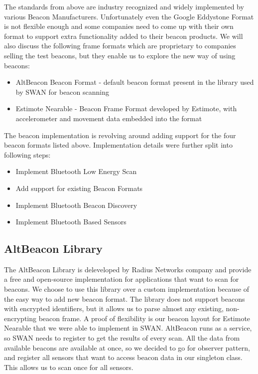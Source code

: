 The standards from above are industry recognized and widely implemented by various Beacon Manufacturers.
Unfortunately even the Google Eddystone Format is not flexible enough and some companies need to come up with their own format to support extra functionality 
added to  their beacon products. We will also discuss the following frame formats which are proprietary to companies selling the test beacons, but they enable us to explore the
new way of using beacons:
\begin{itemize}
 \item AltBeacon Beacon Format - default beacon format present in the library used by SWAN for beacon scanning
 \item Estimote Nearable - Beacon Frame Format developed by Estimote\cite{estimote_company}, with accelerometer and movement data embedded into the format
\end{itemize}

The beacon implementation is revolving around adding support for the four beacon formats listed above. Implementation details were further split into
following steps:
\begin{itemize}
 \item Implement Bluetooth Low Energy Scan
 \item Add support for existing Beacon Formats
 \item Implement Bluetooth Beacon Discovery
 \item Implement Bluetooth Based Sensors
\end{itemize}

\subsection{AltBeacon Library}
The AltBeacon Library is deleveloped by Radius Networks company and provide a free and open-source implementation for applications that want to scan for beacons.
We choose to use this library over a custom implementation because of the easy way to add new beacon format. The library does not support beacons with encrypted 
identifiers, but it allows us to parse almost any existing, non-encrypting beacon frame. A proof of flexibility is our beacon layout for Estimote Nearable that we were able to 
implement in SWAN.
AltBeacon runs as a service, so SWAN needs to register to get the results of every scan. All the data from available beacons are available at once, so we decided to go for observer 
pattern, and register all sensors that want to access beacon data in our singleton class. This allows us to scan once for all sensors.

